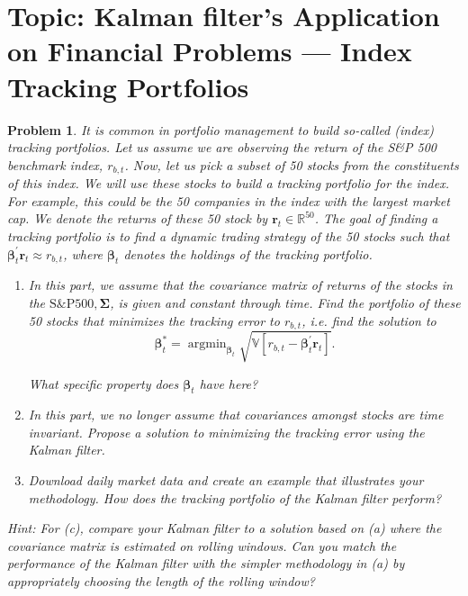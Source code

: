 \documentclass[11pt]{article}
\theoremstyle{plain} %
\newtheorem{problem}[theorem]{Problem}
\theoremstyle{remark}
\begin{document}
\section{Topic: Kalman filter's Application on Financial Problems --- Index Tracking Portfolios}

\begin{problem}
It is common in portfolio management to build so-called (index) tracking portfolios. Let us assume we are observing the return of the S\&P 500 benchmark index, $r_{b, t}$. Now, let us pick a subset of 50 stocks from the constituents of this index. We will use these stocks to build a tracking portfolio for the index. For example, this could be the 50 companies in the index with the largest market cap. We denote the returns of these 50 stock by $\mathbf{r}_t \in \mathbb{R}^{50}$. The goal of finding a tracking portfolio is to find a dynamic trading strategy of the 50 stocks such that $\boldsymbol{\beta}_t^{\prime} \mathbf{r}_t \approx r_{b, t}$, where $\boldsymbol{\beta}_t$ denotes the holdings of the tracking portfolio.
\begin{enumerate}[label=(\alph*)]
  \item In this part, we assume that the covariance matrix of returns of the stocks in the $\mathrm{S} \& \mathrm{P} 500, \boldsymbol{\Sigma}$, is given and constant through time. Find the portfolio of these 50 stocks that minimizes the tracking error to $r_{b, t}$, i.e. find the solution to
        $$
          \boldsymbol{\beta}_t^*=\operatorname{argmin}_{\boldsymbol{\beta}_t} \sqrt{\mathbb{V}\left[r_{b, t}-\boldsymbol{\beta}_t^{\prime} \mathbf{r}_t\right]} .
        $$

        What specific property does $\boldsymbol{\beta}_t$ have here?
  \item In this part, we no longer assume that covariances amongst stocks are time invariant. Propose a solution to minimizing the tracking error using the Kalman filter.
  \item Download daily market data and create an example that illustrates your methodology. How does the tracking portfolio of the Kalman filter perform?
\end{enumerate}
Hint: For (c), compare your Kalman filter to a solution based on (a) where the covariance matrix is estimated on rolling windows. Can you match the performance of the Kalman filter with the simpler methodology in (a) by appropriately choosing the length of the rolling window?
\end{problem}
\end{document}
